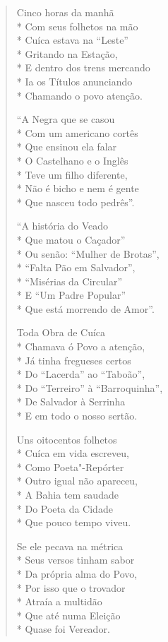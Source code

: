 \begin{verse}
Cinco horas da manhã\\*
Com seus folhetos na mão\\*
Cuíca estava na ``Leste''\\*
Gritando na Estação,\\*
E dentro dos trens mercando\\*
Ia os Títulos anunciando\\*
Chamando o povo atenção.

``A Negra que se casou\\*
Com um americano cortês\\*
Que ensinou ela falar\\*
O Castelhano e o Inglês\\*
Teve um filho diferente,\\*
Não é bicho e nem é gente\\*
Que nasceu todo pedrês''.

``A história do Veado\\*
Que matou o Caçador''\\*
Ou senão: ``Mulher de Brotas'',\\*
``Falta Pão em Salvador'',\\*
``Misérias da Circular''\\*
E ``Um Padre Popular''\\*
Que está morrendo de Amor''.

Toda Obra de Cuíca\\*
Chamava ó Povo a atenção,\\*
Já tinha fregueses certos\\*
Do ``Lacerda'' ao ``Taboão'',\\*
Do ``Terreiro'' à ``Barroquinha'',\\*
De Salvador à Serrinha\\*
E em todo o nosso sertão.

Uns oitocentos folhetos\\*
Cuíca em vida escreveu,\\*
Como Poeta"-Repórter\\*
Outro igual não apareceu,\\*
A Bahia tem saudade\\*
Do Poeta da Cidade\\*
Que pouco tempo viveu.

Se ele pecava na métrica\\*
Seus versos tinham sabor\\*
Da própria alma do Povo,\\*
Por isso que o trovador\\*
Atraía a multidão\\*
Que até numa Eleição\\*
Quase foi Vereador.


\end{verse}
